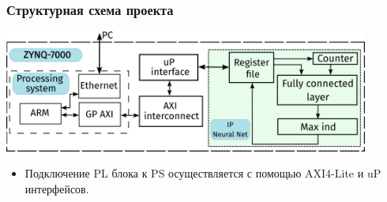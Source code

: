 \begin{frame}[t]
    \frametitle{Структурная схема проекта}
    \begin{block}{} %
        \vspace{1mm}
        \centering \includegraphics[width = 0.9\textwidth]{pics/struct.png}
        \begin{itemize}\small
            \item Подключение PL блока к PS осуществляется с помощью AXI4-Lite и uP интерфейсов.
        \end{itemize}     
    \end{block}  
\end{frame}


